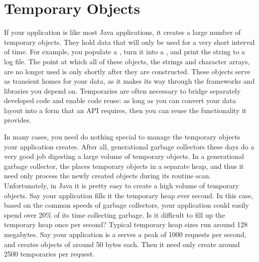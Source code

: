 
\section{Temporary Objects}
\label{temporary-lifetime}

If your application is like most Java applications, it creates a large number of
temporary objects. They hold data that will only be used for a very short
interval of time. For example, you populate a , turn it into
a , and print the string to a log file. The point at which all of
these objects, the strings and character arrays, are no longer used is only
shortly after they are constructed. These objects serve as transient homes for
your data, as it makes its way through the frameworks and libraries you depend
on. Temporaries are often necessary to bridge separately developed code and
enable code reuse: as long as you can convert your data layout into a form that
an API requires, then you can reuse the functionality it provides.

In many cases, you need do nothing special to manage the temporary objects your
application creates. After all, generational garbage collectors these days do a
very good job digesting a large volume of temporary objects. In a generational
garbage collector, the \jre places temporary objects in a separate heap, and
thus it need only process the newly created objects during its routine scan.
Unfortunately, in Java it is pretty easy to create a high volume of temporary
objects. Say your application 
fills it the temporary heap ever second. In this case, based on the common
speeds of garbage collectors, your application could easily spend over 20\% of its time
collecting garbage.
Is it difficult to fill up the temporary heap once per second? Typical
temporary heap sizes run around 128 megabytes. Say your application is a serves
a peak of 1000 requests per second, and creates objects of around 50 bytes each.
Then it need only create around 2500 temporaries per request. 


